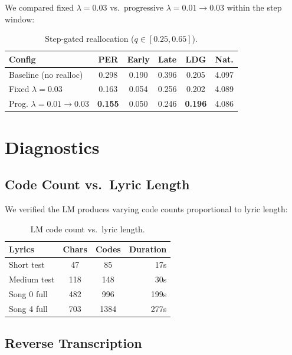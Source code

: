 \documentclass[11pt,a4paper]{article}
\begin{document}
We compared fixed $\lambda=0.03$ vs.\ progressive $\lambda=0.01\to0.03$ within the step window:

\begin{table}[h]
\centering
\caption{Step-gated reallocation ($q \in [0.25, 0.65]$).}
\label{tab:stepgate}
\begin{tabular}{lccccc}
\toprule
Config & PER & Early & Late & LDG & Nat.\\
\midrule
Baseline (no realloc) & 0.298 & 0.190 & 0.396 & 0.205 & 4.097 \\
Fixed $\lambda=0.03$ & 0.163 & 0.054 & 0.256 & 0.202 & 4.089 \\
Prog. $\lambda=0.01\to0.03$ & \textbf{0.155} & 0.050 & 0.246 & \textbf{0.196} & 4.086 \\
\bottomrule
\end{tabular}
\end{table}

\section{Diagnostics}
\label{sec:diag}

\subsection{Code Count vs.\ Lyric Length}

We verified the LM produces varying code counts proportional to lyric length:

\begin{table}[h]
\centering
\caption{LM code count vs.\ lyric length.}
\label{tab:codes}
\begin{tabular}{lccr}
\toprule
Lyrics & Chars & Codes & Duration \\
\midrule
Short test & 47 & 85 & 17s \\
Medium test & 118 & 148 & 30s \\
Song 0 full & 482 & 996 & 199s \\
Song 4 full & 703 & 1384 & 277s \\
\bottomrule
\end{tabular}
\end{table}

\subsection{Reverse Transcription}
\end{document}
